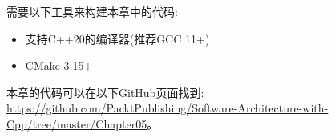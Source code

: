 
需要以下工具来构建本章中的代码:

\begin{itemize}
\item 支持C++20的编译器(推荐GCC 11+)
\item CMake 3.15+
\end{itemize}

本章的代码可以在以下GitHub页面找到: \url{https://github.com/PacktPublishing/Software-Architecture-with-Cpp/tree/master/Chapter05}。